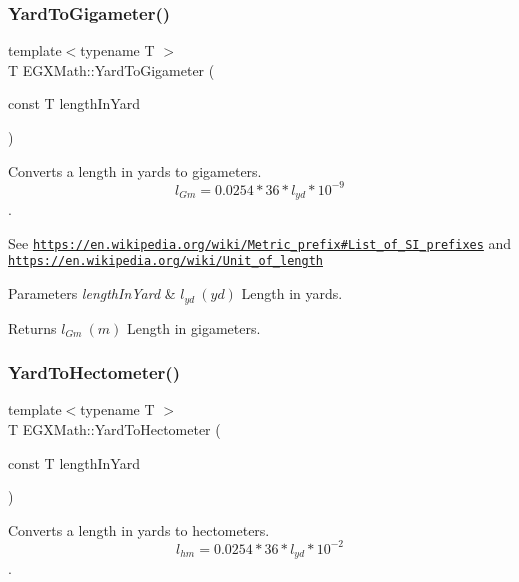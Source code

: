 \subsubsection{\texorpdfstring{Yard\+To\+Gigameter()}{YardToGigameter()}}
{\footnotesize\ttfamily template$<$typename T $>$ \\
T E\+G\+X\+Math\+::\+Yard\+To\+Gigameter (\begin{DoxyParamCaption}\item[{const T}]{length\+In\+Yard }\end{DoxyParamCaption})}



Converts a length in yards to gigameters. \[ l_{Gm}=0.0254 * 36 * l_{yd} * 10^{-9} \]. 

See \href{https://en.wikipedia.org/wiki/Metric_prefix#List_of_SI_prefixes}{\tt https\+://en.\+wikipedia.\+org/wiki/\+Metric\+\_\+prefix\#\+List\+\_\+of\+\_\+\+S\+I\+\_\+prefixes} and \href{https://en.wikipedia.org/wiki/Unit_of_length}{\tt https\+://en.\+wikipedia.\+org/wiki/\+Unit\+\_\+of\+\_\+length} 
\begin{DoxyParams}{Parameters}
{\em length\+In\+Yard} & $ l_{yd}\ (yd)$ Length in yards. \\
\hline
\end{DoxyParams}
\begin{DoxyReturn}{Returns}
$ l_{Gm}\ (m)$ Length in gigameters. 
\end{DoxyReturn}
\mbox{\label{group___e_g_x_math-_conversions-_length_conversions-_imperial-_yard-_s_i_ga7aa38196844c4bec3698c86ce582af65}} 
\subsubsection{\texorpdfstring{Yard\+To\+Hectometer()}{YardToHectometer()}}
{\footnotesize\ttfamily template$<$typename T $>$ \\
T E\+G\+X\+Math\+::\+Yard\+To\+Hectometer (\begin{DoxyParamCaption}\item[{const T}]{length\+In\+Yard }\end{DoxyParamCaption})}



Converts a length in yards to hectometers. \[ l_{hm}=0.0254 * 36 * l_{yd} * 10^{-2} \]. 

